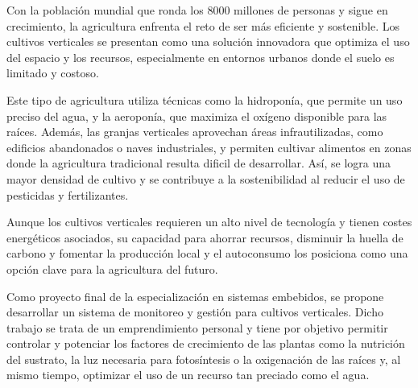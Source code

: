 \documentclass[
11pt, %
]{charter}
\begin{document}





Con la población mundial que ronda los 8000 millones de personas y sigue en crecimiento, la agricultura enfrenta el reto de ser más eficiente y sostenible. Los cultivos verticales se presentan como una solución innovadora que optimiza el uso del espacio y los recursos, especialmente en entornos urbanos donde el suelo es limitado y costoso.

Este tipo de agricultura utiliza técnicas como la hidroponía, que permite un uso preciso del agua, y la aeroponía, que maximiza el oxígeno disponible para las raíces. Además, las granjas verticales aprovechan áreas infrautilizadas, como edificios abandonados o naves industriales, y permiten cultivar alimentos en zonas donde la agricultura tradicional resulta dificil de desarrollar. Así, se logra una mayor densidad de cultivo y se contribuye a la sostenibilidad al reducir el uso de pesticidas y fertilizantes.

Aunque los cultivos verticales requieren un alto nivel de tecnología y tienen costes energéticos asociados, su capacidad para ahorrar recursos, disminuir la huella de carbono y fomentar la producción local y el autoconsumo los posiciona como una opción clave para la agricultura del futuro.

Como proyecto final de la especialización en sistemas embebidos, se propone desarrollar un sistema de monitoreo y gestión para cultivos verticales. Dicho trabajo se trata de un emprendimiento personal y tiene por objetivo permitir controlar y potenciar los factores de crecimiento de las plantas como la nutrición del sustrato, la luz necesaria para fotosíntesis o la oxigenación de las raíces y, al mismo tiempo, optimizar el uso de un recurso tan preciado como el agua.
\end{document}
